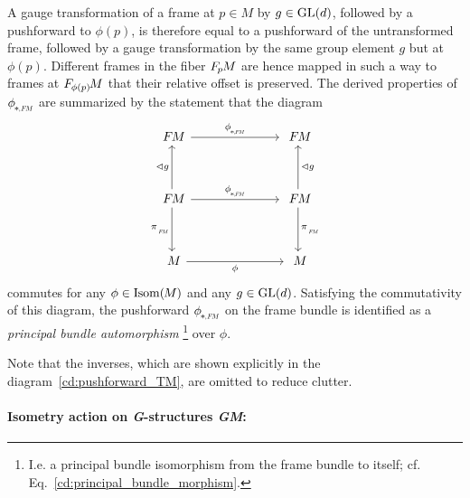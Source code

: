 A gauge transformation of a frame at $p\in M$ by $g\in \operatorname{GL}(d)$, followed by a pushforward to $\phi(p)$, is therefore equal to a pushforward of the untransformed frame, followed by a gauge transformation by the same group element $g$ but at $\phi(p)$.
Different frames in the fiber $F_{\mkern-1.5mu p}\mkern-1.0muM$ are hence mapped in such a way to frames at $F_{\mkern-1mu\phi(p)}\mkern-2mu M$ that their relative offset is preserved.
The derived properties of $\dphiFM$ are summarized by the statement that the diagram
\begin{equation}\label{eq:FM_isom_induced_automorphism}
\begin{tikzcd}[column sep=70pt, row sep=35, font=\normalsize]
    \FM
        \arrow[r, "\dphiFM"]
    &
    \FM
    \\
    \FM
        \arrow[r, "\dphiFM"]
        \arrow[d, "\piFM"']
        \arrow[u, "\lhd g"]
    &
    \FM
        \arrow[d, "\piFM"]
        \arrow[u, "\lhd g"']
    \\
    M
        \arrow[r, "\phi"']
    &
    M
\end{tikzcd}
\end{equation}
commutes for any $\phi\in\operatorname{Isom}(\mkern-1.5mu M \mkern-.5mu)$ and any $g\in \operatorname{GL}(d)$.
Satisfying the commutativity of this diagram, the pushforward $\dphiFM$ on the frame bundle is identified as a \emph{principal bundle automorphism}%
\footnote{
    I.e. a principal bundle isomorphism from the frame bundle to itself; cf. Eq.~\ref{cd:principal_bundle_morphism}.
}
over $\phi$.

Note that the inverses, which are shown explicitly in the diagram~\eqref{cd:pushforward_TM}, are omitted to reduce clutter.






\paragraph{Isometry action on \textit{G}-structures \textit{GM}:}

